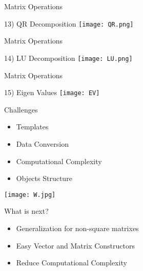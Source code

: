 \documentclass[10pt]{beamer}
\begin{document}
\begin{frame}{Matrix Operations}
\begin{block}{13) QR Decomposition}
\center
\texttt{[image: QR.png]}
\end{block}
\end{frame}
\begin{frame}{Matrix Operations}
\begin{block}{14) LU Decomposition}
\center
\texttt{[image: LU.png]}
\end{block}
\end{frame}
\begin{frame}{Matrix Operations}
\begin{block}{15) Eigen Values}
\center
\texttt{[image: EV]}
\end{block}
\end{frame}
\begin{frame}{Challenges}
\begin{itemize}
\item Templates
\item Data Conversion
\item Computational Complexity
\item Objects Structure
\end{itemize}
\texttt{[image: W.jpg]}
\end{frame}
\begin{frame}{What is next?}
\begin{itemize}
\item Generalization for non-square matrixes
\item Easy Vector and Matrix Constructors
\item Reduce Computational Complexity 
\end{itemize}
\end{frame}
\end{document}
